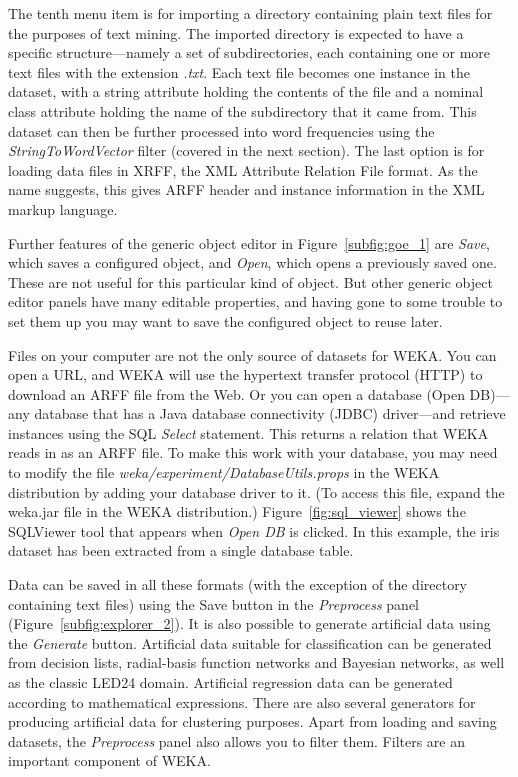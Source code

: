 The tenth menu item is for importing a directory containing plain text
files for the purposes of text mining. The imported directory is
expected to have a specific structure---namely a set of
subdirectories, each containing one or more text files with the
extension \textit{.txt}. Each text file becomes one instance in the
dataset, with a string attribute holding the contents of the file and
a nominal class attribute holding the name of the subdirectory that it
came from. This dataset can then be further processed into word
frequencies using the \textit{StringToWordVector} filter (covered in
the next section). The last option is for loading data files in XRFF,
the XML Attribute Relation File format. As the name suggests, this
gives ARFF header and instance information in the XML markup language.

Further features of the generic object editor in Figure~\ref{subfig:goe_1} are
\textit{Save}, which saves a configured object, and \textit{Open},
which opens a previously saved one. These are not useful for this
particular kind of object. But other generic object editor panels have
many editable properties, and having gone to some trouble to set them
up you may want to save the configured object to reuse later.

Files on your computer are not the only source of datasets for
WEKA. You can open a URL, and WEKA will use the hypertext transfer
protocol (HTTP) to download an ARFF file from the Web. Or you can open
a database (Open DB)---any database that has a Java database
connectivity (JDBC) driver---and retrieve instances using the SQL
\textit{Select} statement. This returns a relation that WEKA reads in
as an ARFF file. To make this work with your database, you may need to
modify the file \textit{weka/experiment/DatabaseUtils.props} in the
WEKA distribution by adding your database driver to it. (To access
this file, expand the weka.jar file in the WEKA distribution.)
Figure~\ref{fig:sql_viewer} shows the SQLViewer tool that appears when
\textit{Open DB} is clicked. In this example, the iris dataset has been
extracted from a single database table.

Data can be saved in all these formats (with the exception of the
directory containing text files) using the Save button in the
\textit{Preprocess} panel (Figure~\ref{subfig:explorer_2}). It is also
possible to generate artificial data using the \textit{Generate}
button. Artificial data suitable for classification can be generated
from decision lists, radial-basis function networks and Bayesian
networks, as well as the classic LED24 domain. Artificial regression
data can be generated according to mathematical expressions. There are
also several generators for producing artificial data for clustering
purposes. Apart from loading and saving datasets, the
\textit{Preprocess} panel also allows you to filter them. Filters are
an important component of WEKA.


